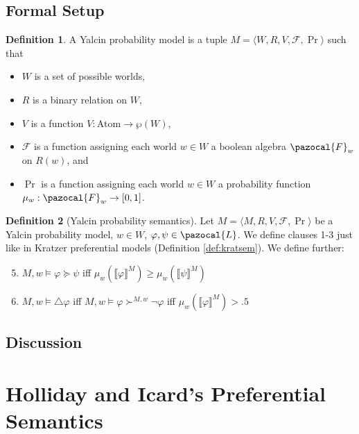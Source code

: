 \documentclass{article}
\theoremstyle{definition}
\newtheorem{definition}{Definition}
\renewcommand{\L}{\pazocal{L}}
\renewcommand{\F}{\pazocal{F}}
\newcommand{\lb}{\llbracket}
\newcommand{\rb}{\rrbracket}
\begin{document}
\subsection{Formal Setup}
\begin{definition}
    A Yalcin probability model is a tuple $M = \langle W,R,V,\mathcal{F},\Pr\rangle$ such that
    \begin{itemize}[nosep]
        \renewcommand\labelitemi{--}
      \item $W$ is a  set of possible worlds,
      \item $R$ is a binary relation on $W$,
        \item $V$ is a function $V: \text{Atom} \rightarrow \wp(W)$,
        \item $\mathcal{F}$ is a function assigning each world $w \in W$ a boolean algebra $\F_w$ on $R(w)$, and 
          \item $\Pr$ is a function assigning each world $w \in W$ a probability function \\ $\mu_w: \F_w \rightarrow [0,1]$.
    \end{itemize}
\end{definition}

\begin{definition}[Yalcin probability semantics]
    \label{def:yalcsem}
    Let $M = \langle M,R,V,\mathcal{F},\Pr \rangle$ be a Yalcin probability model, $w \in W$, $\varphi, \psi \in \L$. We define clauses 1-3 just like in Kratzer preferential models (Definition \ref{def:kratsem}). We define further:
    \begin{enumerate}[nosep]
  \setcounter{enumi}{4}
      \item $M,w \models \varphi \succeq \psi$ iff $\mu_w(\lb \varphi \rb^M) \geq \mu_w(\lb \psi \rb^M) $
      \item $M,w \models \triangle \varphi$ iff $M,w \models \varphi \succ^{M,w} \neg \varphi$ iff $ \mu_w(\lb \varphi \rb^M) > .5$
    \end{enumerate}
\end{definition}

\subsection{Discussion}
\section{Holliday and Icard's Preferential Semantics}
\end{document}
